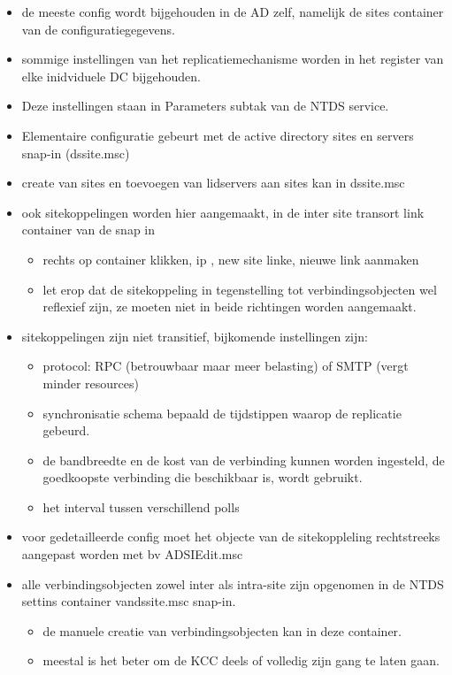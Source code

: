 \begin{itemize}
\item de meeste config wordt bijgehouden in de AD zelf, namelijk de sites container van de configuratiegegevens.
\item sommige instellingen van het replicatiemechanisme worden in het register van elke inidviduele DC bijgehouden.
\item Deze instellingen staan in Parameters subtak van de NTDS service.
\item Elementaire configuratie gebeurt met de active directory sites en servers snap-in (dssite.msc)
\item create van sites en toevoegen van lidservers aan sites kan in dssite.msc
\item ook sitekoppelingen worden hier aangemaakt, in de inter site transort link container van de snap in
\begin{itemize}
\item rechts op container klikken, ip , new site linke, nieuwe link aanmaken
\item let erop dat de sitekoppeling in tegenstelling tot verbindingsobjecten wel reflexief zijn, ze moeten niet in beide richtingen worden aangemaakt.
\end{itemize}
\item sitekoppelingen zijn niet transitief, bijkomende instellingen zijn:
\begin{itemize}
\item protocol: RPC (betrouwbaar maar meer belasting) of SMTP (vergt minder resources)
\item synchronisatie schema bepaald de tijdstippen waarop de replicatie gebeurd.
\item de bandbreedte en de kost van de verbinding kunnen worden ingesteld, de goedkoopste verbinding die beschikbaar is, wordt gebruikt.
\item het interval tussen verschillend polls
\end{itemize}

\item voor gedetailleerde config moet het objecte van de sitekoppleling rechtstreeks aangepast worden met bv ADSIEdit.msc
\item alle verbindingsobjecten zowel inter als intra-site zijn opgenomen in de NTDS settins container vandssite.msc snap-in.
\begin{itemize}
\item de manuele creatie van verbindingsobjecten kan in deze container.
\item meestal is het beter om de KCC deels of volledig zijn gang te laten gaan.
\end{itemize}


\end{itemize}
